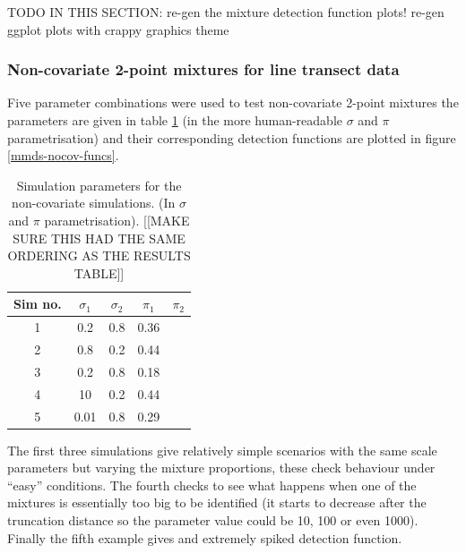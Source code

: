 TODO IN THIS SECTION:
	re-gen the mixture detection function plots!
	re-gen ggplot plots with crappy graphics theme



\subsubsection{Non-covariate 2-point mixtures for line transect data}

Five parameter combinations were used to test non-covariate 2-point mixtures the parameters are given in table \ref{mmds-nocov-simtable} (in the more human-readable $\sigma$ and $\pi$ parametrisation) and their corresponding detection functions are plotted in figure \ref{mmds-nocov-funcs}.

\begin{table}[ht]
\centering
\begin{tabular}{c c c c c}
Sim no. & $\sigma_1$ & $\sigma_2$ & $\pi_1$ & $\pi_2$\\
\hline
\hline
1 & 0.2  &  0.8  &  0.36 & \\
2 & 0.8  &  0.2  &  0.44 & \\
3 & 0.2  &  0.8  &  0.18 & \\
4 & 10  &  0.2  &  0.44 & \\
5 & 0.01  &  0.8  &  0.29 & \\
\end{tabular}
\label{mmds-nocov-simtable}
\caption{Simulation parameters for the non-covariate simulations. (In $\sigma$ and $\pi$ parametrisation). [[MAKE SURE THIS HAD THE SAME ORDERING AS THE RESULTS TABLE]]}
\end{table}

The first three simulations give relatively simple scenarios with the same scale parameters but varying the mixture proportions, these check behaviour under ``easy'' conditions. The fourth checks to see what happens when one of the mixtures is essentially too big to be identified (it starts to decrease after the truncation distance so the parameter value could be 10, 100 or even 1000). Finally the fifth example gives and extremely spiked detection function.

